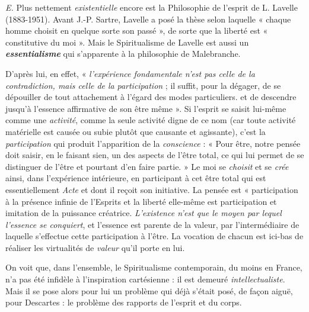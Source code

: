 {\it E.} Plus nettement {\it existentielle} encore est la Philosophie de l'esprit
de L. Lavelle (1883-1951). Avant J.-P. Sartre, Lavelle a posé la
thèse selon laquelle « chaque homme choisit en quelque sorte son
passé », de sorte que la liberté est « constitutive du moi ». Mais le
Spiritualisme de Lavelle est aussi un \textbf{\textit {essentialisme}} qui s’apparente
à la philosophie de Malebranche.

\vspace{0.24cm}
{\footnotesize D'après lui, en effet, « {\it l'expérience fondamentale n'est pas celle de la contradiction,
mais celle de la} \textsf{\textit {participation}} ; il suffit, pour la dégager, de se dépouiller
de tout attachement à l'égard des modes particuliers. et de descendre jusqu’à
l'essence affirmative de son être même ». Si l'esprit se saisit lui-même comme
une {\it activité}, comme la seule activité digne de ce nom (car toute activité
matérielle est causée ou subie plutôt que causante et agissante), c’est la
{\it participation} qui produit l'apparition de la {\it conscience} : « Pour être, notre
pensée doit saisir, en le faisant sien, un des aspects de l'être total, ce qui
lui permet de se distinguer de l’être et pourtant d’en faire partie. » Le moi
se {\it choisit} et se {\it crée} ainsi, dans l'expérience intérieure, en participant à cet
être total qui est essentiellement \textsf{\textit {Acte}} et dont il reçoit son initiative. La
pensée est « participation à la présence infinie de l’Esprits et la liberté
elle-même est participation et imitation de la puissance créatrice. {\it L'existence
n'est que le moyen par lequel l'essence se conquiert}, et l'essence est
parente de la valeur, par l'intermédiaire de laquelle s'effectue cette participation
à l'être. La vocation de chacun est ici-bas de réaliser les virtualités
de \textsf{\textit {valeur}} qu’il porte en lui.}
%
\vspace{0.31cm}

On voit que, dans l’ensemble, le Spiritualisme contemporain, du
moins en France, n’a pas été infidèle à l'inspiration cartésienne :
il est demeuré {\it intellectualiste}. Mais il se pose alors pour lui un problème
qui déjà s’était posé, de façon aiguë, pour Descartes : le problème des
rapports de l'esprit et du corps.

